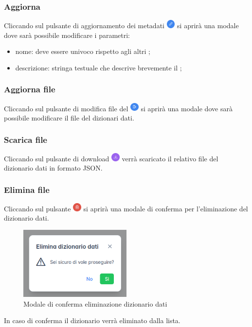 \subsubsection{Aggiorna }
Cliccando sul pulsante di aggiornamento dei metadati \includegraphics[height=1.2em]{assets/dd_edit_metadata_button.png} si aprirà una modale dove sarà possibile modificare i parametri:
\begin{itemize}
  \item nome: deve essere univoco rispetto agli altri ;
  \item descrizione: stringa testuale che descrive brevemente il ;
\end{itemize}

\subsubsection{Aggiorna file }
Cliccando sul pulsante di modifica file del  \includegraphics[height=1.2em]{assets/dd_edit_button.png} si aprirà una modale dove sarà possibile modificare il file del dizionari dati.

\subsubsection{Scarica file }
Cliccando sul pulsante di download \includegraphics[height=1.2em]{assets/dd_download_button.png} verrà scaricato il relativo file del dizionario dati in formato JSON.

\subsubsection{Elimina file }
Cliccando sul pulsante \includegraphics[height=1.2em]{assets/dd_delete_button.png} si aprirà una modale di conferma per l'eliminazione del dizionario dati.
\begin{figure}[H]
  \centering
  \includegraphics[width=0.5\textwidth]{assets/dd_confirm_delete.png}
  \caption{Modale di conferma eliminazione dizionario dati}
\end{figure}
In caso di conferma il dizionario verrà eliminato dalla lista.
